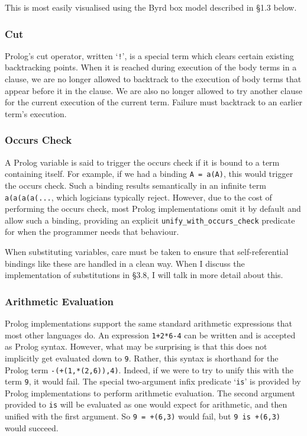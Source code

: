 \documentclass[12pt]{article}
\begin{document}
This is most easily visualised using the Byrd box model described in \S1.3 below.

\subsubsection{Cut}

Prolog's cut operator, written `\verb|!|', is a special term which clears certain existing backtracking points.
When it is reached during execution of the body terms in a clause, we are no longer allowed to backtrack to the execution of body terms that appear before it in the clause. 
We are also no longer allowed to try another clause for the current execution of the current term. 
Failure must backtrack to an earlier term's execution.

\subsubsection{Occurs Check}

A Prolog variable is said to trigger the occurs check if it is bound to a term containing itself.
For example, if we had a binding \verb|A = a(A)|, this would trigger the occurs check.
Such a binding results semantically in an infinite term \verb|a(a(a(a(...|, which logicians typically reject.
However, due to the cost of performing the occurs check, most Prolog implementations omit it by default and allow such a binding, providing an explicit \verb|unify_with_occurs_check| predicate for when the programmer needs that behaviour.

When substituting variables, care must be taken to ensure that self-referential bindings like these are handled in a clean way.
When I discuss the implementation of substitutions in \S3.8, I will talk in more detail about this.

\subsubsection{Arithmetic Evaluation}

Prolog implementations support the same standard arithmetic expressions that most other languages do.
An expression \verb|1+2*6-4| can be written and is accepted as Prolog syntax.
However, what may be surprising is that this does not implicitly get evaluated down to \verb|9|. 
Rather, this syntax is shorthand for the Prolog term \verb|-(+(1,*(2,6)),4)|.
Indeed, if we were to try to unify this with the term \verb|9|, it would fail.
The special two-argument infix predicate `\verb|is|' is provided by Prolog implementations to perform arithmetic evaluation.
The second argument provided to \verb|is| will be evaluated as one would expect for arithmetic, and then unified with the first argument.
So \verb|9 = +(6,3)| would fail, but \verb|9 is +(6,3)| would succeed.
\end{document}
